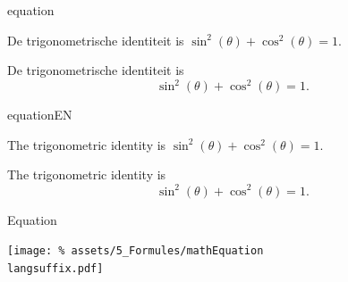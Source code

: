 \documentclass[presentatie.tex]{subfiles}
\begin{document}

\begin{saveblock}{equation}
	\begin{highlightblock}[gobble=8,linewidth=\textwidth,
		framexleftmargin=0.25em,xleftmargin=0.25em]
		De trigonometrische identiteit is
		$ \sin^2(\theta) + \cos^2(\theta) = 1 $.

		De trigonometrische identiteit is 
		\begin{equation}
			\sin^2(\theta) + \cos^2(\theta) = 1.
		\end{equation}
	\end{highlightblock}
\end{saveblock}

\begin{saveblock}{equationEN}
	\begin{highlightblock}[gobble=8,linewidth=\textwidth,
		framexleftmargin=0.25em,xleftmargin=0.25em]
		The trigonometric identity is
		$ \sin^2(\theta) + \cos^2(\theta) = 1 $.

		The trigonometric identity is
		\begin{equation}
			\sin^2(\theta) + \cos^2(\theta) = 1.
		\end{equation}
	\end{highlightblock}
\end{saveblock}



\begin{frame}{Equation}

	\texttt{[image: \%
		assets/5\_Formules/mathEquation\\langsuffix.pdf]}

\end{frame}
\end{document}
